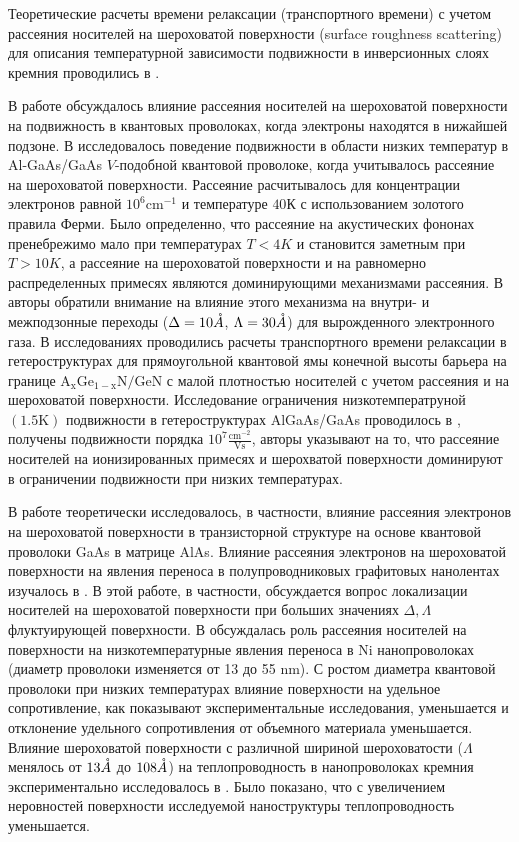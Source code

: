 Теоретические расчеты времени релаксации (транспортного времени) с учетом рассеяния носителей на шероховатой поверхности (surface roughness scattering) для описания температурной зависимости подвижности в инверсионных слоях кремния проводились в \cite{Stern1980,Masaki1989}.

В работе \cite{Motohisa1992} обсуждалось влияние рассеяния носителей на шероховатой поверхности на подвижность в квантовых проволоках, когда электроны находятся в нижайшей подзоне. В \cite{Tsetseri2004,Tsetseri2008} исследовалось поведение подвижности в области низких температур в Al-GaAs/GaAs $V$-подобной квантовой проволоке, когда учитывалось рассеяние на шероховатой поверхности. Рассеяние расчитывалось для концентрации электронов равной $10^6 \mathrm{cm^{−1}}$ и температуре $40К$ с использованием золотого правила Ферми. Было определенно, что рассеяние на акустических фононах пренебрежимо мало при температурах $T<4K$ и становится заметным при $T>10K$, а рассеяние на шероховатой поверхности и на равномерно распределенных примесях являются доминирующими механизмами рассеяния.
В \cite{Vurgaftman1997} авторы обратили внимание на влияние этого механизма на внутри- и межподзонные переходы ($\Delta =10\AA$, $\Lambda =30 \AA$) для вырожденного электронного газа. В исследованиях \cite{Quang2006} проводились расчеты транспортного времени релаксации в гетероструктурах для прямоугольной квантовой ямы конечной высоты барьера на границе $\mathrm{ A_{x}Ge_{1-x}N/GeN}$ с малой плотностью носителей с учетом рассеяния и на шероховатой поверхности.
Исследование ограничения низкотемператруной $(1.5 \mathrm{K})$ подвижности в гетероструктурах AlGaAs/GaAs проводилось в \cite{Saku1996,Saku1991}, получены подвижности порядка $10^7 \frac{\text{cm}^{-2}}{\text{Vs}}$, авторы указывают на то, что рассеяние носителей на ионизированных примесях и шерохватой поверхности доминируют в ограничении подвижности при низких температурах.

В работе \cite{Borzdov2007} теоретически исследовалось, в частности, влияние рассеяния электронов на шероховатой поверхности в транзисторной структуре на основе квантовой проволоки GaAs в матрице AlAs. Влияние рассеяния электронов на шероховатой поверхности на явления переноса в полупроводниковых графитовых нанолентах изучалось в \cite{Fang2008}. В этой работе, в частности, обсуждается вопрос локализации носителей на шероховатой поверхности при больших значениях $\Delta, \Lambda$ флуктуирующей поверхности. В \cite{Kamalakar2009} обсуждалась роль рассеяния носителей на поверхности на низкотемпературные явления переноса в Ni нанопроволоках (диаметр проволоки изменяется от 13 до 55 nm). С ростом диаметра квантовой проволоки при низких температурах влияние поверхности на удельное сопротивление, как показывают экспериментальные исследования, уменьшается и отклонение удельного сопротивления от объемного материала уменьшается. Влияние шероховатой поверхности с различной шириной шероховатости ($\Lambda $ менялось от $13 \AA$  до $108 \AA$) на теплопроводность в нанопроволоках кремния экспериментально исследовалось в \cite{Liu2010}. Было показано, что с увеличением неровностей поверхности исследуемой наноструктуры теплопроводность уменьшается.


